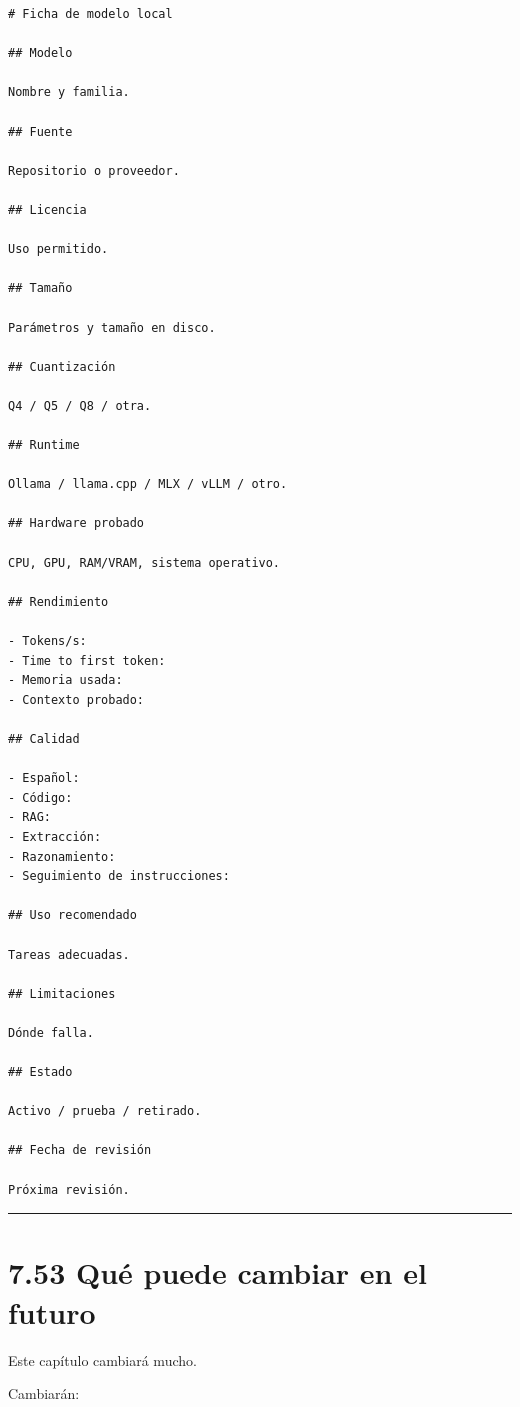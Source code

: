 \begin{lstlisting}
# Ficha de modelo local

## Modelo

Nombre y familia.

## Fuente

Repositorio o proveedor.

## Licencia

Uso permitido.

## Tamaño

Parámetros y tamaño en disco.

## Cuantización

Q4 / Q5 / Q8 / otra.

## Runtime

Ollama / llama.cpp / MLX / vLLM / otro.

## Hardware probado

CPU, GPU, RAM/VRAM, sistema operativo.

## Rendimiento

- Tokens/s:
- Time to first token:
- Memoria usada:
- Contexto probado:

## Calidad

- Español:
- Código:
- RAG:
- Extracción:
- Razonamiento:
- Seguimiento de instrucciones:

## Uso recomendado

Tareas adecuadas.

## Limitaciones

Dónde falla.

## Estado

Activo / prueba / retirado.

## Fecha de revisión

Próxima revisión.
\end{lstlisting}

\begin{center}\rule{0.5\linewidth}{0.5pt}\end{center}

\section{7.53 Qué puede cambiar en el
futuro}\label{quuxe9-puede-cambiar-en-el-futuro-6}

Este capítulo cambiará mucho.

Cambiarán:

